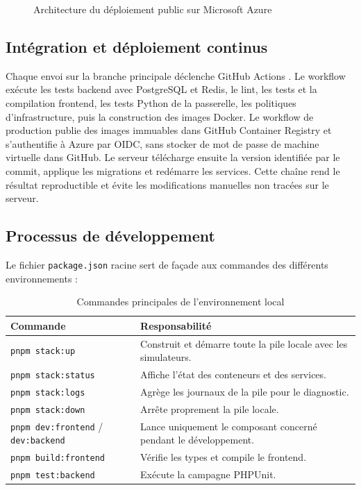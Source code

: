 \begin{figure}[H]
  \centering
  \resizebox{0.96\textwidth}{!}{}
  \caption{Architecture du déploiement public sur Microsoft Azure}
  \label{fig:production-deployment}
\end{figure}

\subsection{Intégration et déploiement continus}

Chaque envoi sur la branche principale déclenche GitHub Actions
\cite{githubActions}. Le workflow exécute les tests backend avec PostgreSQL et
Redis, le lint, les tests et la compilation frontend, les tests Python de la
passerelle, les politiques d'infrastructure, puis la construction des images
Docker. Le workflow de production publie des images immuables dans GitHub
Container Registry et s'authentifie à Azure par OIDC, sans stocker de mot de
passe de machine virtuelle dans GitHub. Le serveur télécharge ensuite la version
identifiée par le commit, applique les migrations et redémarre les services.
Cette chaîne rend le résultat reproductible et évite les modifications manuelles
non tracées sur le serveur.

\subsection{Processus de développement}

Le fichier \texttt{package.json} racine sert de façade aux commandes des
différents environnements :

\begin{table}[H]
  \centering
  \caption{Commandes principales de l'environnement local}
  \label{tab:implementation-commands}
  \begin{tabularx}{\textwidth}{|p{4.4cm}|Y|}
    \hline
    \textbf{Commande} & \textbf{Responsabilité}\\\hline
    \texttt{pnpm stack:up} & Construit et démarre toute la pile locale avec les
    simulateurs.\\\hline
    \texttt{pnpm stack:status} & Affiche l'état des conteneurs et des services.\\\hline
    \texttt{pnpm stack:logs} & Agrège les journaux de la pile pour le diagnostic.\\\hline
    \texttt{pnpm stack:down} & Arrête proprement la pile locale.\\\hline
    \texttt{pnpm dev:frontend} / \texttt{dev:backend} & Lance uniquement le
    composant concerné pendant le développement.\\\hline
    \texttt{pnpm build:frontend} & Vérifie les types et compile le frontend.\\\hline
    \texttt{pnpm test:backend} & Exécute la campagne PHPUnit.\\\hline
  \end{tabularx}
\end{table}

